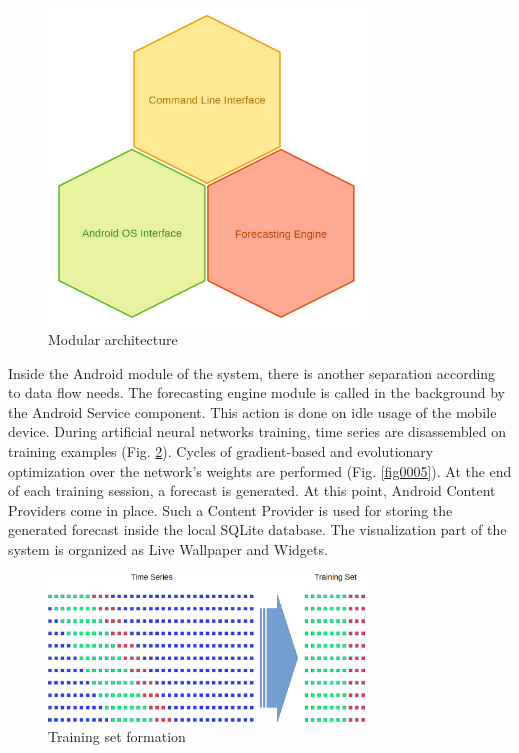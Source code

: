 \documentclass{ifacconf}
\begin{document}
\begin{figure}
\begin{center}
\includegraphics[width=8.4cm]{images/fig0003}
\caption{Modular architecture} 
\label{fig0003}
\end{center}
\end{figure}

Inside the Android module of the system, there is another separation according to data flow needs. The forecasting engine module is called in the background by the Android Service component. This action is done on idle usage of the mobile device. During artificial neural networks training, time series are disassembled on training examples (Fig. \ref{fig0004}). Cycles of gradient-based and evolutionary optimization over the network's weights are performed (Fig. \ref{fig0005}). At the end of each training session, a forecast is generated. At this point, Android Content Providers come in place. Such a Content Provider is used for storing the generated forecast inside the local SQLite database. The visualization part of the system is organized as Live Wallpaper and Widgets.

\begin{figure}
\begin{center}
\includegraphics[width=8.4cm]{images/fig0004}
\caption{Training set formation} 
\label{fig0004}
\end{center}
\end{figure}
\end{document}
